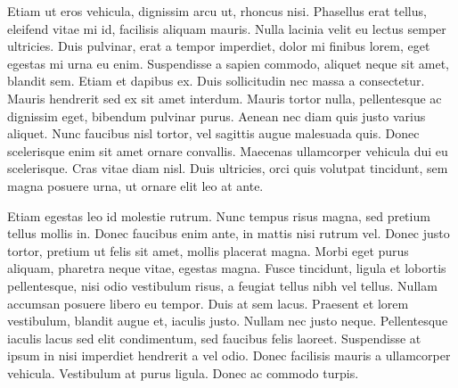 \documentclass[11pt,a4paper]{article}
\begin{document}
Etiam ut eros vehicula, dignissim arcu ut, rhoncus nisi. Phasellus erat tellus,
eleifend vitae mi id, facilisis aliquam mauris. Nulla lacinia velit eu lectus
semper ultricies. Duis pulvinar, erat a tempor imperdiet, dolor mi finibus
lorem, eget egestas mi urna eu enim. Suspendisse a sapien commodo, aliquet neque
sit amet, blandit sem. Etiam et dapibus ex. Duis sollicitudin nec massa a
consectetur. Mauris hendrerit sed ex sit amet interdum. Mauris tortor nulla,
pellentesque ac dignissim eget, bibendum pulvinar purus. Aenean nec diam quis
justo varius aliquet. Nunc faucibus nisl tortor, vel sagittis augue malesuada
quis. Donec scelerisque enim sit amet ornare convallis. Maecenas ullamcorper
vehicula dui eu scelerisque. Cras vitae diam nisl. Duis ultricies, orci quis
volutpat tincidunt, sem magna posuere urna, ut ornare elit leo at ante.

Etiam egestas leo id molestie rutrum. Nunc tempus risus magna, sed pretium
tellus mollis in. Donec faucibus enim ante, in mattis nisi rutrum vel. Donec
justo tortor, pretium ut felis sit amet, mollis placerat magna. Morbi eget purus
aliquam, pharetra neque vitae, egestas magna. Fusce tincidunt, ligula et
lobortis pellentesque, nisi odio vestibulum risus, a feugiat tellus nibh vel
tellus. Nullam accumsan posuere libero eu tempor. Duis at sem lacus. Praesent et
lorem vestibulum, blandit augue et, iaculis justo. Nullam nec justo neque.
Pellentesque iaculis lacus sed elit condimentum, sed faucibus felis laoreet.
Suspendisse at ipsum in nisi imperdiet hendrerit a vel odio. Donec facilisis
mauris a ullamcorper vehicula. Vestibulum at purus ligula. Donec ac commodo
turpis.
\end{document}
